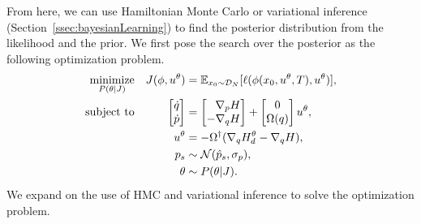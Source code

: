 From here, we can use Hamiltonian Monte Carlo or variational inference (Section~\ref{ssec:bayesianLearning}) to find the posterior distribution from the likelihood and the prior.
%
We first pose the search over the posterior as the following optimization problem.
\begin{equation}
    \begin{aligned}
        \underset{P(\theta | J)}{\textrm{minimize}} 
        & & J(\phi, u^\theta) &= \mathbb{E}_{x_0 \sim \mathcal{D}_N}[ \ell(\phi(x_0, u^\theta, T), u^\theta)]  , \\
        \textrm{subject to}
        & & \bmat{\dot{q} \\ \dot{p}} &= \bmat{\phantom{-}\nabla_p H \\ -\nabla_q H} + \bmat{0 \\ \Omega(q)}u^{\theta}, \\%
        & & u^{\theta} &= -\Omega^{\dagger} (\nabla_q H_d^{\theta} - \nabla_q H), \\
        & & p_s &\sim \mathcal{N}(\hat{p}_s, \sigma_p), \\
        & & \theta &\sim P(\theta | J).
    \end{aligned}
    \label{eq:smooth_bayesian_pbc}
\end{equation}
We expand on the use of HMC and variational inference to solve the optimization problem.
%
